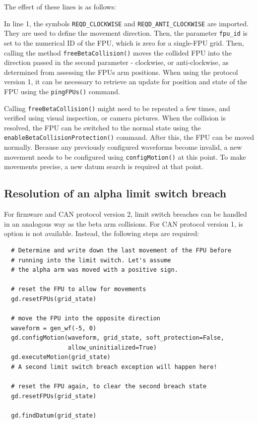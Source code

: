\documentclass[11pt,a4paper]{scrartcl}
\begin{document}
The effect of these lines is as follows:

In line 1, the symbols \texttt{REQD\_CLOCKWISE} and
\texttt{REQD\_ANTI\_CLOCKWISE} are imported. They are used to define
the movement direction. Then, the parameter \texttt{fpu\_id} is set to
the numerical ID of the FPU, which is zero for a single-FPU
grid. Then, calling the method \texttt{freeBetaCollision()} moves the
collided FPU into the direction passed in the second parameter -
clockwise, or anti-clockwise, as determined from assessing the FPUs
arm positions. When using the protocol version 1, it can be necessary
to retrieve an update for position and state of the FPU using the
\texttt{pingFPUs()} command.

Calling \texttt{freeBetaCollision()} might need to be repeated a few
times, and verified using visual inspection, or camera pictures. When
the collision is resolved, the FPU can be switched to the normal state
using the \texttt{enableBetaCollisionProtection()} command.  After
this, the FPU can be moved normally. Because any previously configured
waveforms become invalid, a new movement needs to be configured using
\texttt{configMotion()} at this point. To make movements precise, a
new datum search is required at that point.

\subsection{Resolution of an alpha limit switch breach}
For firmware and CAN protocol  version 2, limit switch
breaches can be handled in an analogous way as the
beta arm collisions. For CAN protocol version 1,
is option is not available. Instead, the following
steps are required:

\begin{verbatim}
  # Determine and write down the last movement of the FPU before
  # running into the limit switch. Let's assume
  # the alpha arm was moved with a positive sign.

  # reset the FPU to allow for movements
  gd.resetFPUs(grid_state)

  # move the FPU into the opposite direction
  waveform = gen_wf(-5, 0)
  gd.configMotion(waveform, grid_state, soft_protection=False,
                  allow_uninitialized=True)
  gd.executeMotion(grid_state)
  # A second limit switch breach exception will happen here!

  # reset the FPU again, to clear the second breach state
  gd.resetFPUs(grid_state)

  gd.findDatum(grid_state)
  
\end{verbatim}
  
\end{document}
